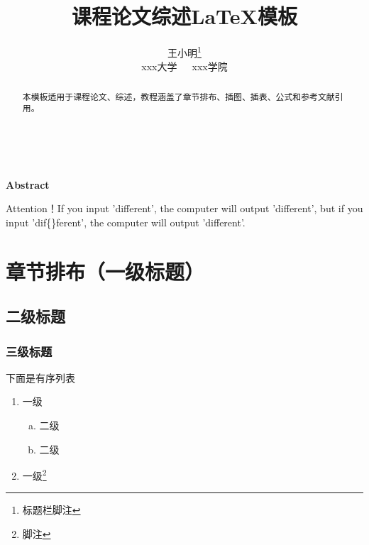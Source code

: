 \documentclass[12pt,a4paper]{article}%
\title{\fontsize{18pt}{27pt}\selectfont%
	{\heiti%
		课程论文综述\LaTeX 模板}}%
\author{\fontsize{12pt}{18pt}\selectfont%
	{\fangsong%
		王小明}\thanks{标题栏脚注}\\%
	\fontsize{10.5pt}{15.75pt}\selectfont%
	{\fangsong%
		xxx大学~~~xxx学院}}%
\date{}%
\begin{document}
    \maketitle%
    \lhead{}%
    \chead{}%
    \rhead{}%
    \lfoot{}%
    \cfoot{\thepage}%
    \rfoot{}%
    \begin{abstract}
        \fangsong 本模板适用于课程论文、综述，教程涵盖了章节排布、插图、插表、公式和参考文献引用。
    \end{abstract}
    
    \begin{adjustwidth}{1.06cm}{1.06cm}
        \fontsize{10.5pt}{15.75pt}\\
    \end{adjustwidth}
    
    \begin{center}%
        {\textbf{Abstract}}%
    \end{center}
    \begin{adjustwidth}{1.06cm}{1.06cm}%
        \hspace{1.5em}Attention！If you input 'dif{}ferent', the computer will output 'different', but if you input 'dif\{\}ferent', the computer will output 'dif{}ferent'.
    \end{adjustwidth}
	
    \section{章节排布（一级标题）}
    \subsection{二级标题}
    \subsubsection{三级标题}
    下面是有序列表
    \begin{enumerate}[1.]%
        \setlength{\itemindent}{2em} %
        \item 一级
        \begin{enumerate}[(a)]%
        \setlength{\itemindent}{2em} %
        \item 二级
        \item 二级
        \end{enumerate}
        \item 一级\footnote{脚注}%
    \end{enumerate}
    
\end{document}
